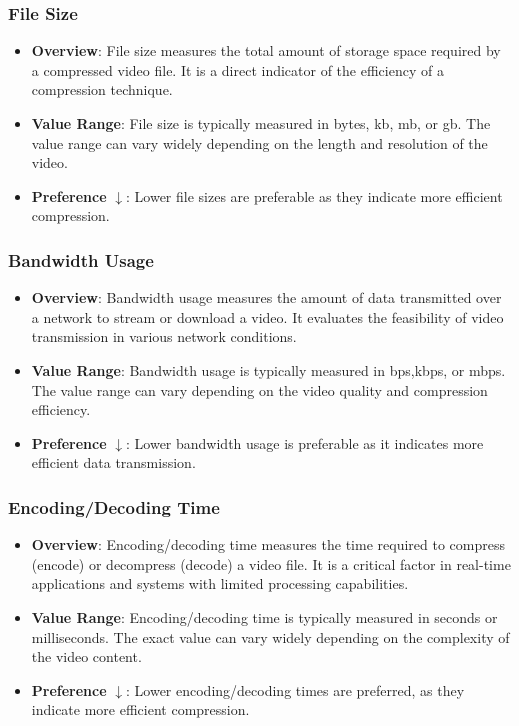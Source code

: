 \documentclass{ioereport}
\begin{document}
        \subsubsection{File Size}
            \begin{itemize}
                \item \textbf{Overview}: File size measures the total amount of storage space required by a compressed video file. It is a direct indicator of the efficiency of a compression technique.
                \item \textbf{Value Range}: File size is typically measured in bytes, \gls{kb}, \gls{mb}, or \gls{gb}. The value range can vary widely depending on the length and resolution of the video.
                \item \textbf{Preference} $\downarrow$: Lower file sizes are preferable as they indicate more efficient compression.
            \end{itemize}

        \subsubsection{Bandwidth Usage}
            \begin{itemize}
                \item \textbf{Overview}: Bandwidth usage measures the amount of data transmitted over a network to stream or download a video. It evaluates the feasibility of video transmission in various network conditions.
                \item \textbf{Value Range}:  Bandwidth usage is typically measured in \gls{bps},\gls{kbps}, or \gls{mbps}. The value range can vary depending on the video quality and compression efficiency.
                \item \textbf{Preference} $\downarrow$: Lower bandwidth usage is preferable as it indicates more efficient data transmission.
            \end{itemize}

        \subsubsection{Encoding/Decoding Time}
        \begin{itemize}
            \item \textbf{Overview}: Encoding/decoding time measures the time required to compress (encode) or decompress (decode) a video file. It is a critical factor in real-time applications and systems with limited processing capabilities.
            \item \textbf{Value Range}: Encoding/decoding time is typically measured in seconds or milliseconds. The exact value can vary widely depending on the complexity of the video content.
            \item \textbf{Preference} $\downarrow$: Lower encoding/decoding times are preferred, as they indicate more efficient compression.
        \end{itemize}
\end{document}
